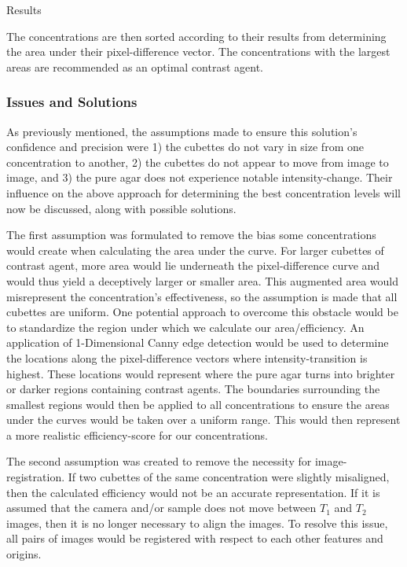 \documentclass[a4paper,12pt]{article}
\begin{document}
\begin{section}{Results}
\doublespacing

The concentrations are then sorted according to their results from determining the area under their pixel-difference vector. The concentrations with the largest areas are recommended as an optimal contrast agent.

\subsubsection{Issues and Solutions}

As previously mentioned, the assumptions made to ensure this solution's confidence and precision were 1) the cubettes do not vary in size from one concentration to another, 2) the cubettes do not appear to move from image to image, and 3) the pure agar does not experience notable intensity-change. Their influence on the above approach for determining the best concentration levels will now be discussed, along with possible solutions.

The first assumption was formulated to remove the bias some concentrations would create when calculating the area under the curve. For larger cubettes of contrast agent, more area would lie underneath the pixel-difference curve and would thus yield a deceptively larger or smaller area. This augmented area would misrepresent the concentration's effectiveness, so the assumption is made that all cubettes are uniform. One potential approach to overcome this obstacle would be to standardize the region under which we calculate our area/efficiency. An application of 1-Dimensional Canny edge detection would be used to determine the locations along the pixel-difference vectors where intensity-transition is highest. These locations would represent where the pure agar turns into brighter or darker regions containing contrast agents. The boundaries surrounding the smallest regions would then be applied to all concentrations to ensure the areas under the curves would be taken over a uniform range. This would then represent a more realistic efficiency-score for our concentrations.

The second assumption was created to remove the necessity for image-registration. If two cubettes of the same concentration were slightly misaligned, then the calculated efficiency would not be an accurate representation. If it is assumed that the camera and/or sample does not move between $T_1$ and $T_2$ images, then it is no longer necessary to align the images. To resolve this issue, all pairs of images would be registered with respect to each other features and origins.


\end{section}
\end{document}
